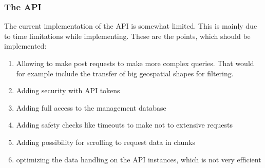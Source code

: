 \subsubsection{The API}\label{the-api}

The current implementation of the API is somewhat limited. This is
mainly due to time limitations while implementing. These are the points,
which should be implemented:

\begin{enumerate}
\def\labelenumi{\arabic{enumi}.}
\tightlist
\item
  Allowing to make post requests to make more complex queries. That
  would for example include the transfer of big geospatial shapes for
  filtering.
\item
  Adding security with API tokens
\item
  Adding full access to the management database
\item
  Adding safety checks like timeouts to make not to extensive requests
\item
  Adding possibility for scrolling to request data in chunks
\item
  optimizing the data handling on the API instances, which is not very
  efficient
\end{enumerate}
